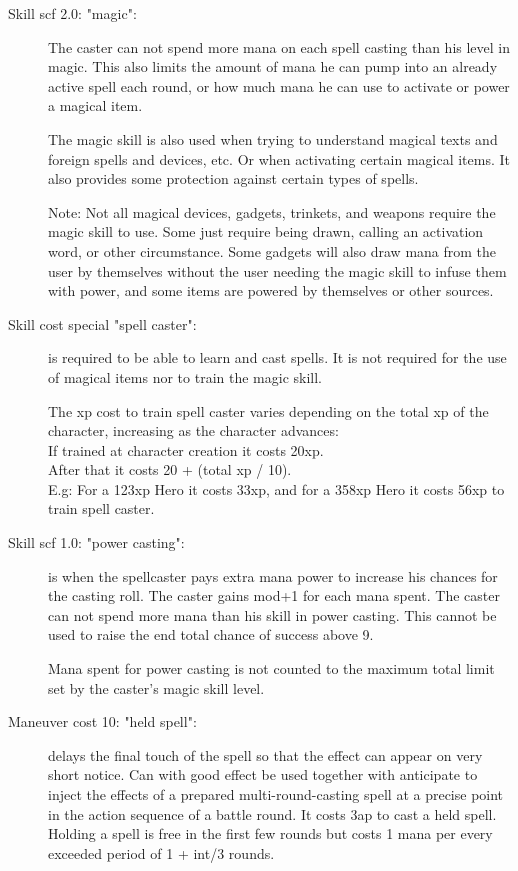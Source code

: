 \begin{description}


\item[Skill scf 2.0: "magic":] The caster can not spend more mana on each spell casting than his level in magic. This also limits the amount of mana he can pump into an already active spell each round, or how much mana he can use to activate or power a magical item.

The magic skill is also used when trying to understand magical texts and foreign spells and devices, etc. Or when activating certain magical items. It also provides some protection against certain types of spells.

Note: Not all magical devices, gadgets, trinkets, and weapons require the magic skill to use. Some just require being drawn, calling an activation word, or other circumstance. Some gadgets will also draw mana from the user by themselves without the user needing the magic skill to infuse them with power, and some items are powered by themselves or other sources.


\item[Skill cost special "spell caster":] is required to be able to learn and cast spells. It is not required for the use of magical items nor to train the magic skill.

The xp cost to train spell caster varies depending on the total xp of the character, increasing as the character advances:\\
If trained at character creation it costs 20xp.\\
After that it costs 20 + (total xp / 10).\\
E.g: For a 123xp Hero it costs 33xp, and for a 358xp Hero it costs 56xp to train spell caster.


\item[Skill scf 1.0: "power casting":] is when the spellcaster pays extra mana power to increase his chances for the casting roll. The caster gains mod+1 for each mana spent. The caster can not spend more mana than his skill in power casting. This cannot be used to raise the end total chance of success above 9.

Mana spent for power casting is not counted to the maximum total limit set by the caster's magic skill level.


\item[Maneuver cost 10: "held spell":] delays the final touch of the spell so that the effect can appear on very short notice. Can with good effect be used together with anticipate to inject the effects of a prepared multi-round-casting spell at a precise point in the action sequence of a battle round. It costs 3ap to cast a held spell. Holding a spell is free in the first few rounds but costs 1 mana per every exceeded period of 1 + int/3 rounds.



\end{description}
